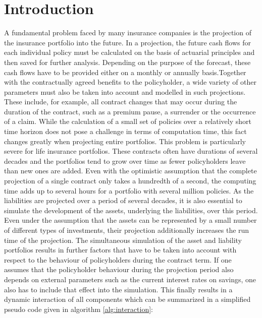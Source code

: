 

\chapter{Introduction}
\label{cha:introduction}

A fundamental problem faced by many insurance companies is the projection of the insurance portfolio into the future. In a projection, the future cash flows for each individual policy must be calculated on the basis of actuarial principles and then saved for further analysis. Depending on the purpose of the forecast, these cash flows have to be provided either on a monthly or annually basis.Together with the contractually agreed benefits to the policyholder, a wide variety of other parameters must also be taken into account and modelled in such projections. These include, for example, all contract changes that may occur during the duration of the contract, such as a premium pause, a surrender or the occurrence of a claim. While the calculation of a small set of policies over a relatively short time horizon does not pose a challenge in terms of computation time, this fact changes greatly when projecting entire portfolios. This problem is particularly severe for life insurance portfolios. These contracts often have durations of several decades and the portfolios tend to grow over time as fewer policyholders leave than new ones are added. Even with the optimistic assumption that the complete projection of a single contract only takes a hundredth of a second, the computing time adds up to several hours for a portfolio with several million policies. As the liabilities are projected over a period of several decades, it is also essential to simulate the development of the assets, underlying the liabilities, over this period. Even under the assumption that the assets can be represented by a small number of different types of investments, their projection additionally increases the run time of the projection. The simultaneous simulation of the asset and liability portfolios results in further factors that have to be taken into account with respect to the behaviour of policyholders during the contract term. If one assumes that the policyholder behaviour during the projection period also depends on external parameters such as the current interest rates on savings, one also has to include that effect into the simulation. This finally results in a dynamic interaction of all components which can be summarized in a simplified pseudo code given in algorithm \ref{alg:interaction}:

